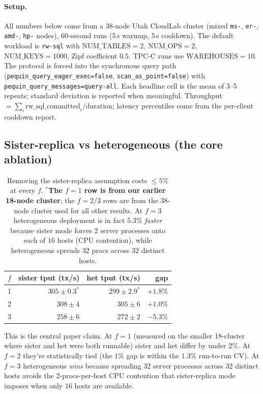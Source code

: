 \documentclass[letterpaper,twocolumn,10pt]{article}
\begin{document}
\paragraph{Setup.} All numbers below come from a 38-node Utah
CloudLab cluster (mixed \texttt{ms-}, \texttt{er-}, \texttt{amd-},
\texttt{hp-} nodes), 60-second runs (5\,s warmup, 5\,s cooldown).
The default workload is \texttt{rw-sql} with $\mathrm{NUM\_TABLES}=2$,
$\mathrm{NUM\_OPS}=2$, $\mathrm{NUM\_KEYS}=1000$, Zipf coefficient
$0.5$. TPC-C runs use $\mathrm{WAREHOUSES}=10$. The protocol is
forced into the synchronous query path
(\texttt{pequin\_query\_eager\_exec=false},
\texttt{scan\_as\_point=false}) with
\texttt{pequin\_query\_messages=query-all}. Each headline cell is the
mean of 3--5 repeats; standard deviation is reported when meaningful.
Throughput $=\sum_i \mathrm{rw\_sql\_committed}_i / \mathrm{duration}$;
latency percentiles come from the per-client cooldown report.

\subsection{Sister-replica vs heterogeneous (the core ablation)}

\begin{table}[h]
\centering
\small
\begin{tabular}{l r r r}
\toprule
$f$ & sister tput (tx/s) & het tput (tx/s) & gap \\
\midrule
1 & $305 \pm 0.3^*$ & $299 \pm 2.9^*$ & $+1.8\%$ \\
2 & $308 \pm 4$     & $305 \pm 6$     & $+1.0\%$ \\
3 & $258 \pm 6$     & $272 \pm 2$     & $-5.3\%$ \\
\bottomrule
\end{tabular}
\caption{Removing the sister-replica assumption costs $\leq 5\%$ at
every $f$. \textbf{$^*$The $f=1$ row is from our earlier 18-node
cluster}; the $f=2/3$ rows are from the 38-node cluster used for
all other results. At $f=3$ heterogeneous deployment is in fact
$5.3\%$ \emph{faster} because sister mode forces 2 server processes
onto each of $16$ hosts (CPU contention), while heterogeneous spreads
$32$ procs across $32$ distinct hosts.}
\label{tab:ablation}
\end{table}

This is the central paper claim. At $f=1$ (measured on the smaller
18-cluster where sister and het were both runnable) sister and het
differ by under $2\%$. At $f=2$ they're statistically tied (the $1\%$
gap is within the $1.3\%$ run-to-run CV). At $f=3$ heterogeneous
\emph{wins} because spreading 32 server processes across 32 distinct
hosts avoids the 2-procs-per-host CPU contention that sister-replica
mode imposes when only $16$ hosts are available.
\end{document}
